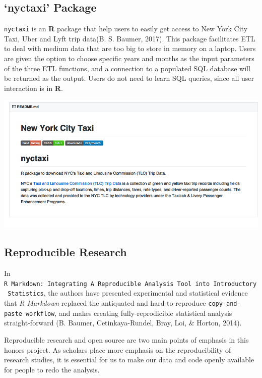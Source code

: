 \documentclass[12pt,twoside]{reedthesis}
\theoremstyle{definition}
\theoremstyle{definition}
\theoremstyle{definition}
\theoremstyle{remark}
\begin{document}
\subsection{\texorpdfstring{`nyctaxi'
Package}{nyctaxi Package}}\label{nyctaxi-package}

\texttt{nyctaxi} is an \textbf{R} package that help users to easily get
access to New York City Taxi, Uber and Lyft trip data(B. S. Baumer,
2017). This package facilitates ETL to deal with medium data that are
too big to store in memory on a laptop. Users are given the option to
choose specific years and months as the input parameters of the three
ETL functions, and a connection to a populated SQL database will be
returned as the output. Users do not need to learn SQL queries, since
all user interaction is in \textbf{R}.
\begin{center}\includegraphics[width=5.88in]{figure/nyctaxi-page} \end{center}

\subsection{Reproducible Research}\label{reproducible-research}

In
\texttt{R\ Markdown:\ Integrating\ A\ Reproducible\ Analysis\ Tool\ into\ Introductory\ Statistics},
the authors have presented experimental and statistical evidence that
\emph{R Markdown} replaced the antiquated and hard-to-reproduce
\texttt{copy-and-paste\ workflow}, and makes creating fully-reprodicible
statistical analysis straight-forward (B. Baumer, Cetinkaya-Rundel,
Bray, Loi, \& Horton, 2014).

Reproducible research and open source are two main points of emphasis in
this honors project. As scholars place more emphasis on the
reproducibility of research studies, it is essential for us to make our
data and code openly available for people to redo the analysis.
\end{document}
